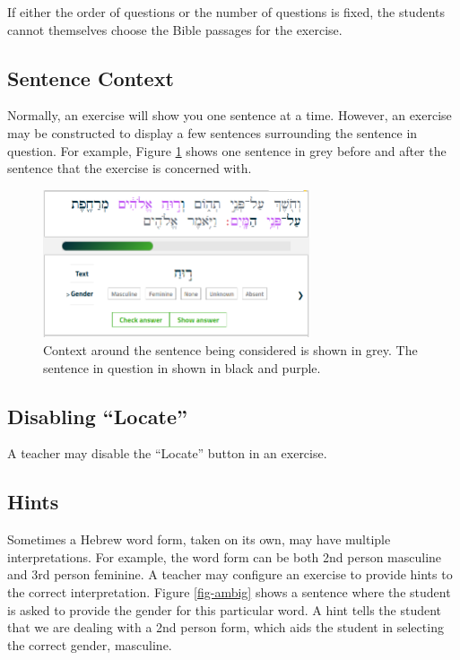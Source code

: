 \documentclass[11pt,oneside,a4paper]{memoir}
\newcommand{\heb}[1]{{\RL {\ezr #1}}}
\begin{document}
If either the order of questions or the number of questions is fixed, the students cannot themselves
choose the Bible passages for the exercise.

\subsection{Sentence Context}

Normally, an exercise will show you one sentence at a time. However, an exercise may be constructed
to display a few sentences surrounding the sentence in question. For example, Figure
\ref{fig-context} shows one sentence in grey before and after the sentence that the exercise is
concerned with.

\begin{figure}
  \begin{center}
    \includegraphics[width=0.7\textwidth]{fig-context.png}
  \end{center}
  \caption{Context around the sentence being considered is shown in grey. The sentence in question
    in shown in black and purple.}\label{fig-context}
\end{figure}


\subsection{Disabling ``Locate''}

A teacher may disable the ``Locate'' button in an exercise.


\subsection{Hints}

Sometimes a Hebrew word form, taken on its own, may have multiple interpretations. For example, the
word form \heb{תֶחֱזֶה} can be both 2nd person masculine and 3rd person feminine. A teacher may
configure an exercise to provide hints to the correct interpretation. Figure \ref{fig-ambig} shows
a sentence where the student is asked to provide the gender for this particular word. A hint tells
the student that we are dealing with a 2nd person form, which aids the student in selecting the
correct gender, masculine.
\end{document}
